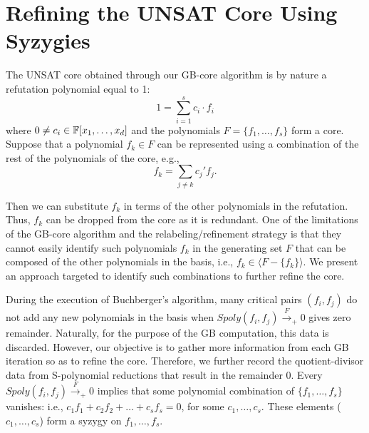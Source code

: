 \section{Refining the UNSAT Core Using Syzygies}
\label{sec:syz}


The UNSAT core obtained through our GB-core algorithm is by nature a
refutation polynomial equal to 1:  
$$1 = \sum_{i=1}^s c_i\cdot f_i$$
where $0 \neq c_i \in {\mathbb{F}}[x_1,\dots,x_d]$ and the polynomials
$F = \{f_1,\dots,f_s\}$ form a core. Suppose that a polynomial 
$f_k \in F$ can be represented using a combination of the rest of the
polynomials of the core, e.g.,
$$f_k = \sum_{j\neq k} c_j'f_j.$$

Then we can substitute $f_k$ in terms of the other polynomials in the
refutation. Thus, $f_k$ can be dropped from the core as it is 
redundant. One of the limitations of the GB-core algorithm and the
relabeling/refinement strategy is that they cannot easily identify
such polynomials $f_k$ in the generating set $F$ that can be composed
of the other polynomials in the basis, i.e.,
$f_k \in \langle F-\{f_k\} \rangle$. We present an approach targeted
to identify such combinations to further refine the core. 
 
 
During the execution of Buchberger's algorithm, many critical pairs
$(f_i,f_j)$ do not add any new polynomials in the basis when
$Spoly(f_i,f_j)\xrightarrow{F}_+0$ gives zero remainder. Naturally,
for the purpose of the GB computation, this data is
discarded. However, our objective is to gather more information from
each GB iteration so as to refine the core. Therefore, we further
record the quotient-divisor data from S-polynomial reductions that
result in the remainder 0. Every $Spoly(f_i,f_j)\xrightarrow{F}_+0$
implies that some polynomial combination of $\{f_1,\dots,f_s\}$
vanishes: i.e., $c_1f_1 + c_2f_2 + \dots+c_sf_s=0$, for some
$c_1,\dots,c_s$. These elements ($c_1,\dots,c_s$) form a syzygy on $f_1,\dots,f_s$. 

